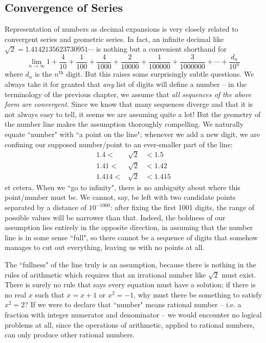 \subsection{Convergence of Series}
Representation of numbers as decimal expansions is very closely related to convergent series and geometric series.
In fact, an infinite decimal like $\sqrt{2}=1.4142135623730951\cdots$ is nothing but a convenient shorthand for
\begin{equation}\label{eq:decimalExpansion}
\lim_{n\to\infty} 1 + \frac{4}{10} + \frac{1}{100} + \frac{4}{1000} + \frac{2}{10000} + \frac{1}{100000} + \frac{3}{1000000} + \cdots +\frac{d_n}{10^n}
\end{equation}
where $d_n$ is the $n^{\mbox{th}}$ digit. But this raises some surprisingly subtle questions. We always take it for granted that \emph{any} list of digits will define a number -- in the terminology of the previous chapter, we assume that \emph{all sequences of the above form are convergent}. Since we know that many sequences diverge and that it is not always easy to tell, it seems we are assuming quite a lot! But the geometry of the number line makes the assumption thoroughly compelling. We naturally equate ``number" with ``a point on the line"; whenever we add a new digit, we are confining our supposed number/point to an ever-smaller part of the line:
\begin{equation*}\begin{array}{ccc}
1.4 < &\sqrt{2} &< 1.5\\
1.41 < &\sqrt{2} &< 1.42\\
1.414 < &\sqrt{2} &< 1.415
\end{array}\end{equation*}
et cetera. When we ``go to infinity", there is no ambiguity about where this point/number must be. We cannot, say, be left with two candidate points separated by a distance of $10^{-1000}$: after fixing the first 1001 digits, the range of possible values will be narrower than that. Indeed, the boldness of our assumption lies entirely in  the opposite direction, in assuming that the number line is in some sense ``full", so there cannot be a sequence of digits that somehow manages to cut out everything, leaving us with no points at all.

The ``fullness" of the line truly is an assumption, because there is nothing in the rules of arithmetic which requires that an irrational number like $\sqrt{2}$ must exist. There is surely no rule that says every equation must have a solution; if there is no real $x$ such that $x=x+1$ or $x^2=-1$, why must there be something to satisfy $x^2=2$? 
If we were to declare that ``number" means rational number -- i.e. a fraction with integer numerator and denominator -- we would encounter no logical problems at all, since the operations of arithmetic, applied to rational numbers, can only produce other rational numbers.

